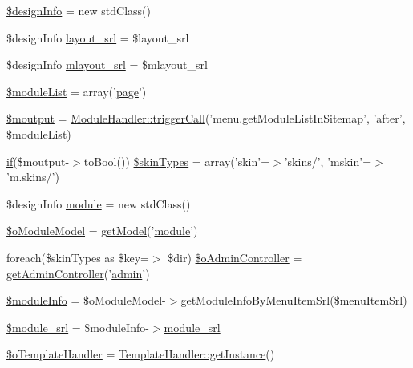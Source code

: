 \begin{DoxyCompactItemize}
\item 
\hyperlink{ko_8install_8php_a99e144f7d563ceb76b003d54739b3b0c}{\$design\+Info} = new std\+Class()
\item 
\$design\+Info \hyperlink{ko_8install_8php_a70054876db09b2519a1726663c8dd9e7}{layout\+\_\+srl} = \$layout\+\_\+srl
\item 
\$design\+Info \hyperlink{ko_8install_8php_a9cf497537007b08c645bed35f564be54}{mlayout\+\_\+srl} = \$mlayout\+\_\+srl
\item 
\hyperlink{ko_8install_8php_aaa80946d50e2d3677fbbc6d6c8a643c3}{\$module\+List} = array('\hyperlink{classpage}{page}')
\item 
\hyperlink{ko_8install_8php_a2598d068355cca17645bc6bd70cc3a8c}{\$moutput} = \hyperlink{classModuleHandler_aa1b1f9eae91ccd76e6a81c9375c2e673}{Module\+Handler\+::trigger\+Call}('menu.\+get\+Module\+List\+In\+Sitemap', 'after', \$module\+List)
\item 
\hyperlink{point__level__icon_8addon_8php_a29031816e50a8f742422e671b2bef9b2}{if}(\$moutput-\/$>$to\+Bool()) \hyperlink{ko_8install_8php_aa61073b7b359568eb3459da113fd8cdf}{\$skin\+Types} = array('skin'=$>$'skins/', 'mskin'=$>$'m.\+skins/')
\item 
\$design\+Info \hyperlink{ko_8install_8php_a5c3fc1968f94c2b6a7c60845f284de78}{module} = new std\+Class()
\item 
\hyperlink{ko_8install_8php_a8d7a87df524e7d6938f66f8e284cdd1e}{\$o\+Module\+Model} = \hyperlink{func_8inc_8php_aecdfcc5332bcf22df01fc21a03b64435}{get\+Model}('\hyperlink{classmodule}{module}')
\item 
foreach(\$skin\+Types as \$key=$>$ \$dir) \hyperlink{ko_8install_8php_a4e2098076e50f24dd86e1062844d25d5}{\$o\+Admin\+Controller} = \hyperlink{func_8inc_8php_a2f7ca88a5226536aca3b2f5682bd7b2d}{get\+Admin\+Controller}('\hyperlink{classadmin}{admin}')
\item 
\hyperlink{ko_8install_8php_ae3552a6dd49f37a50e7858151f7c5cc2}{\$module\+Info} = \$o\+Module\+Model-\/$>$get\+Module\+Info\+By\+Menu\+Item\+Srl(\$menu\+Item\+Srl)
\item 
\hyperlink{ko_8install_8php_ae40aed4d7a99050245e66ca2a82949ed}{\$module\+\_\+srl} = \$module\+Info-\/$>$\hyperlink{ko_8install_8php_a370bb6450fab1da3e0ed9f484a38b761}{module\+\_\+srl}
\item 
\hyperlink{ko_8install_8php_abd57e3ab220291ea9b5c16c2a4e0670e}{\$o\+Template\+Handler} = \hyperlink{classTemplateHandler_a9745460c5daccfc48abf8652778b2718}{Template\+Handler\+::get\+Instance}()
\item 

\end{DoxyCompactItemize}
